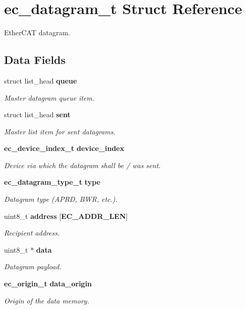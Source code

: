\section{ec\-\_\-datagram\-\_\-t Struct Reference}
\label{structec__datagram__t}


Ether\-C\-A\-T datagram.  


\subsection*{Data Fields}
\begin{DoxyCompactItemize}
\item 
struct list\-\_\-head {\bf queue}
\begin{DoxyCompactList}\small\item\em Master datagram queue item. \end{DoxyCompactList}\item 
struct list\-\_\-head {\bf sent}
\begin{DoxyCompactList}\small\item\em Master list item for sent datagrams. \end{DoxyCompactList}\item 
{\bf ec\-\_\-device\-\_\-index\-\_\-t} {\bf device\-\_\-index}
\begin{DoxyCompactList}\small\item\em Device via which the datagram shall be / was sent. \end{DoxyCompactList}\item 
{\bf ec\-\_\-datagram\-\_\-type\-\_\-t} {\bf type}
\begin{DoxyCompactList}\small\item\em Datagram type (A\-P\-R\-D, B\-W\-R, etc.). \end{DoxyCompactList}\item 
uint8\-\_\-t {\bf address} [{\bf E\-C\-\_\-\-A\-D\-D\-R\-\_\-\-L\-E\-N}]
\begin{DoxyCompactList}\small\item\em Recipient address. \end{DoxyCompactList}\item 
uint8\-\_\-t $\ast$ {\bf data}
\begin{DoxyCompactList}\small\item\em Datagram payload. \end{DoxyCompactList}\item 
{\bf ec\-\_\-origin\-\_\-t} {\bf data\-\_\-origin}
\begin{DoxyCompactList}\small\item\em Origin of the {\itshape data} memory. \end{DoxyCompactList}\item 

\end{DoxyCompactItemize}
